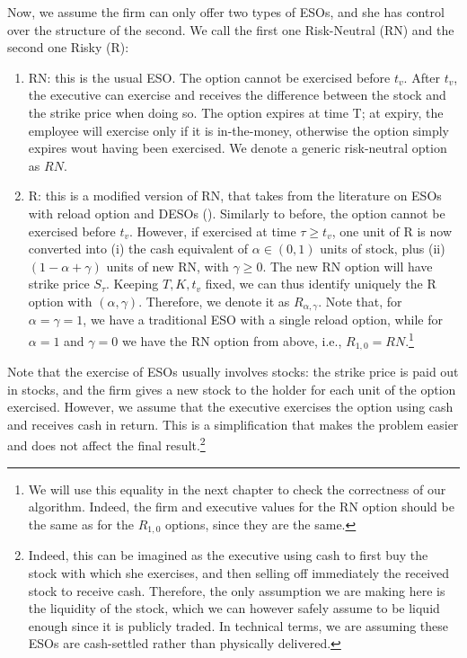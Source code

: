 Now, we assume the firm can only offer two types of ESOs, and she has control over the structure of the second. We call the first one Risk-Neutral (RN) and the second one Risky (R):
\begin{enumerate}
    \item RN: this is the usual ESO. The option cannot be exercised before $t_v$. After $t_v$, the executive can exercise and receives the difference between the stock and the strike price when doing so. The option expires at time T; at expiry, the employee will exercise only if it is in-the-money, otherwise the option simply expires wout having been exercised. We denote a generic risk-neutral option as $RN$.
    \item R: this is a modified version of RN, that takes from the literature on ESOs with reload option and DESOs (\cite{huang2013dynamic}).
    Similarly to before, the option cannot be exercised before $t_v$. However, if exercised at time $\tau \ge t_v$, one unit of R is now converted into (i) the cash equivalent of $\alpha \in (0,1)$ units of stock, plus (ii) $(1 - \alpha + \gamma)$ units of new RN, with $\gamma \ge 0$. The new RN option will have strike price $S_\tau$. Keeping $T, K, t_v$ fixed, we can thus identify uniquely the R option with $(\alpha, \gamma)$. Therefore, we denote it as $R_{\alpha, \gamma}$. Note that, for $\alpha = \gamma = 1$, we have a traditional ESO with a single reload option, while for $\alpha = 1$ and $\gamma = 0$ we have the RN option from above, i.e., $R_{1, 0} = RN$.\footnote{We will use this equality in the next chapter to check the correctness of our algorithm. Indeed, the firm and executive values for the RN option should be the same as for the $R_{1,0}$ options, since they are the same.}
\end{enumerate}
Note that the exercise of ESOs usually involves stocks: the strike price is paid out in stocks, and the firm gives a new stock to the holder for each unit of the option exercised. 
However, we assume that the executive exercises the option using cash and receives cash in return. This is a simplification that makes the problem easier and does not affect the final result.\footnote{Indeed, this can be imagined as the executive using cash to first buy the stock with which she exercises, and then selling off immediately the received stock to receive cash. Therefore, the only assumption we are making here is the liquidity of the stock, which we can however safely assume to be liquid enough since it is publicly traded. In technical terms, we are assuming these ESOs are cash-settled rather than physically delivered.}

